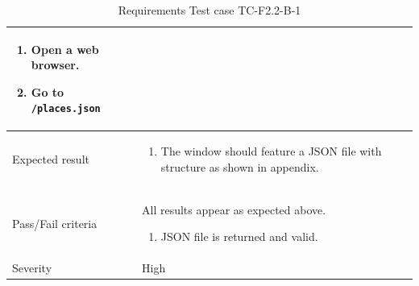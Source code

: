 \documentclass[11pt]{book}
\begin{document}
\begin{table}
\begin{tabular}{| p{3cm} | p{9.5cm} |}
                            \begin{enumerate}
                              \item Open a web browser.
                              \item Go to \texttt{/places.json}
                            \end{enumerate} \\ \hline 
    Expected result       & \begin{enumerate}
                              \item The window should feature a JSON file with structure as shown in appendix. %
                            \end{enumerate} \\ \hline 
    Pass/Fail criteria    & All results appear as expected above.
                            \begin{enumerate}
                              \item JSON file is returned and valid.
                            \end{enumerate} \\ \hline 
    Severity              & High \\ \hline 
  \end{tabular}
  \caption{Requirements Test case TC-F2.2-B-1}
  \label{tab:TCF2.2B1}
\end{table}
\end{document}
